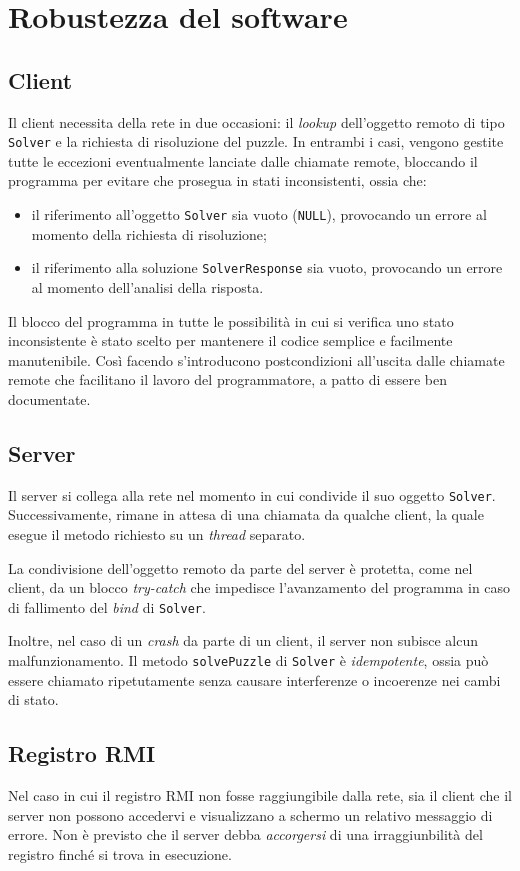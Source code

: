 \documentclass[a4paper, 12pt]{article}
\begin{document}
\section{Robustezza del software}
\subsection{Client}
\label{robust-client}
Il client necessita della rete in due occasioni: il \emph{lookup} dell'oggetto
remoto di tipo \verb|Solver| e la richiesta di risoluzione del puzzle. In
entrambi i casi, vengono gestite tutte le eccezioni eventualmente lanciate dalle
chiamate remote, bloccando il programma per evitare che prosegua in stati
inconsistenti, ossia che:
\begin{itemize}
\item il riferimento all'oggetto \verb|Solver| sia vuoto (\verb|NULL|),
provocando un errore al momento della richiesta di risoluzione;
\item il riferimento alla soluzione \verb|SolverResponse| sia vuoto, provocando
un errore al momento dell'analisi della risposta.
\end{itemize}

Il blocco del programma in tutte le possibilità in cui si verifica uno stato
inconsistente è stato scelto per mantenere il codice semplice e facilmente
manutenibile. Così facendo s'introducono postcondizioni all'uscita dalle
chiamate remote che facilitano il lavoro del programmatore, a patto di essere
ben documentate.
\subsection{Server}
Il server si collega alla rete nel momento in cui condivide il suo oggetto
\verb|Solver|. Successivamente, rimane in attesa di una chiamata da qualche
client, la quale esegue il metodo richiesto su un \emph{thread} separato.

La condivisione dell'oggetto remoto da parte del server è protetta, come nel
client, da un blocco \emph{try-catch} che impedisce l'avanzamento del
programma in caso di fallimento del \emph{bind} di \verb|Solver|.

Inoltre, nel caso di un \emph{crash} da parte di un client, il server non
subisce alcun malfunzionamento. Il metodo \verb|solvePuzzle| di \verb|Solver| è
\emph{idempotente}, ossia può essere chiamato ripetutamente senza causare
interferenze o incoerenze nei cambi di stato.
\subsection{Registro RMI}
Nel caso in cui il registro RMI non fosse raggiungibile dalla rete, sia il
client che il server non possono accedervi e visualizzano a schermo un
relativo messaggio di errore. Non è previsto che il server debba
\emph{accorgersi} di una irraggiunbilità del registro finché si trova in
esecuzione.
\end{document}
